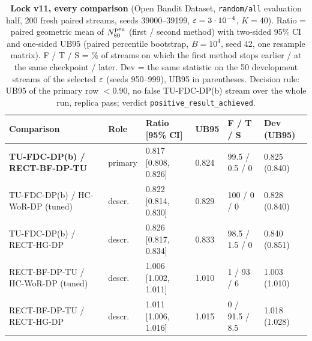 \begin{table}[t]
\caption{\textbf{Lock v11, every comparison} (Open Bandit Dataset, \texttt{random/all} evaluation half, 200 fresh paired streams, seeds 39000--39199, $\varepsilon = 3\cdot 10^{-4}$, $K = 40$). Ratio = paired geometric mean of $N_{80}^{\text{pen}}$ (first / second method) with two-sided 95\% CI and one-sided UB95 (paired percentile bootstrap, $B = 10^4$, seed 42, one resample matrix). F / T / S = \% of streams on which the first method stops earlier / at the same checkpoint / later. Dev = the same statistic on the 50 development streams of the selected $\varepsilon$ (seeds 950--999), UB95 in parentheses. Decision rule: UB95 of the primary row $< 0.90$, no false TU-FDC-DP(b) stream over the whole run, replica pass; verdict \texttt{positive\_result\_achieved}.}
\label{tab:v11ratios}
\small
\setlength{\tabcolsep}{4pt}
\begin{tabular}{@{}llllll@{}}
\toprule
Comparison & Role & Ratio [95\% CI] & UB95 & F / T / S & Dev (UB95) \\
\midrule
\textbf{TU-FDC-DP(b) / RECT-BF-DP-TU} & primary & 0.817 [0.808, 0.826] & 0.824 & 99.5 / 0.5 / 0 & 0.825 (0.840) \\
TU-FDC-DP(b) / HC-WoR-DP (tuned) & descr. & 0.822 [0.814, 0.830] & 0.829 & 100 / 0 / 0 & 0.828 (0.840) \\
TU-FDC-DP(b) / RECT-HG-DP & descr. & 0.826 [0.817, 0.834] & 0.833 & 98.5 / 1.5 / 0 & 0.840 (0.851) \\
RECT-BF-DP-TU / HC-WoR-DP (tuned) & descr. & 1.006 [1.002, 1.011] & 1.010 & 1 / 93 / 6 & 1.003 (1.010) \\
RECT-BF-DP-TU / RECT-HG-DP & descr. & 1.011 [1.006, 1.016] & 1.015 & 0 / 91.5 / 8.5 & 1.018 (1.028) \\
\bottomrule
\end{tabular}
\end{table}
